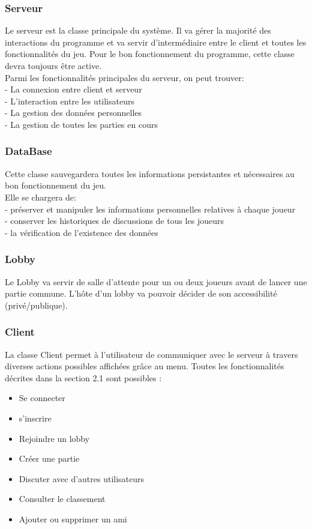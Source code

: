 \documentclass[a4paper,12pt]{article}
\begin{document}
\subsubsection{Serveur}
Le serveur est la classe principale du système. Il va gérer la majorité des interactions du programme et va servir d'intermédiaire entre le client et toutes les fonctionnalités du jeu. Pour le bon fonctionnement du programme, cette classe devra toujours être active.\\
Parmi les fonctionnalités principales du serveur, on peut trouver:\\
- La connexion entre client et serveur\\
- L'interaction entre les utilisateurs\\
- La gestion des données personnelles\\
- La gestion de toutes les parties en cours
\subsubsection{DataBase}
Cette classe sauvegardera toutes les informations persistantes et nécessaires au bon fonctionnement du jeu.\\
Elle se chargera de:\\
- préserver et manipuler les informations personnelles relatives à chaque joueur\\
- conserver les historiques de discussions de tous les joueurs\\
- la vérification de l'existence des données
\subsubsection{Lobby}
Le Lobby va servir de salle d'attente pour un ou deux joueurs avant de lancer une partie commune. L'hôte d'un lobby va pouvoir décider de son accessibilité (privé/publique).

\subsubsection{Client}
La classe Client permet à l'utilisateur de communiquer avec le serveur à travers diverses actions possibles affichées grâce au menu.
Toutes les fonctionnalités décrites dans la section 2.1 sont possibles :
\begin{itemize}
    \item Se connecter
    \item s'inscrire
    \item Rejoindre un lobby
    \item Créer une partie
    \item Discuter avec d'autres utilisateurs
    \item Consulter le classement
    \item Ajouter ou supprimer un ami
\end{itemize}
\end{document}
